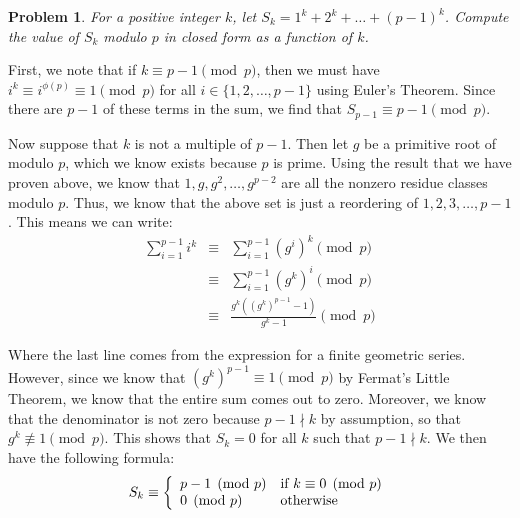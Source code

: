 \documentclass[psamsfonts]{amsart}
\newtheorem{prob}{Problem}[section]
\newenvironment{sol}{{\bfseries Solution}}{\qedsymbol}
\theoremstyle{definition}
\theoremstyle{remark}
\numberwithin{equation}{section}
\begin{document}
\begin{prob}
For a positive integer $k$, let $S_k = 1^k + 2^k + \ldots + (p-1)^k$. Compute the value of $S_k$ modulo $p$ in closed form as a function of $k$.
\end{prob}

\begin{sol}
First, we note that if $k \equiv p - 1 \pmod{p}$, then we must have $i^{k} \equiv i^{\phi(p)} \equiv 1 \pmod{p}$ for all $i \in \{1,2,\ldots, p-1\}$ using Euler's Theorem. Since there are $p-1$ of these terms in the sum, we find that $S_{p-1} \equiv p-1 \pmod{p}$. 

Now suppose that $k$ is not a multiple of $p-1$. Then let $g$ be a primitive root of modulo $p$, which we know exists because $p$ is prime. Using the result that we have proven above, we know that $1,g,g^2, \ldots, g^{p-2}$ are all the nonzero residue classes modulo $p$. Thus, we know that the above set is just a reordering of $1,2,3, \ldots, p-1$. This means we can write:
\begin{eqnarray}
\sum_{i=1}^{p-1} i^k &\equiv& \sum_{i=1}^{p-1} (g^i)^k \pmod{p} \\
&\equiv& \sum_{i=1}^{p-1} (g^k)^i \pmod{p} \\
&\equiv& \frac{g^k ((g^{k})^{p-1} - 1)}{g^k - 1} \pmod{p}
\end{eqnarray}

Where the last line comes from the expression for a finite geometric series. However, since we know that $(g^k)^{p-1} \equiv 1 \pmod{p}$ by Fermat's Little Theorem, we know that the entire sum comes out to zero. Moreover, we know that the denominator is not zero because $p - 1 \nmid k$ by assumption, so that $g^{k} \not \equiv 1 \pmod{p}$. This shows that $S_k = 0$ for all $k$ such that $p-1 \nmid k$. We then have the following formula:
\begin{equation}
S_k \equiv \left\{ \begin{array} {l l}
p-1 \pmod{p} & \text{if } k \equiv 0 \pmod{p} \\
0 \pmod{p} & \text{otherwise}
\end{array} \right. 
\end{equation}
\end{sol}
\end{document}
